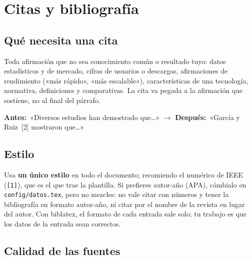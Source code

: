 \documentclass[11pt,a4paper]{article}
\newcommand{\antes}[1]{\textcolor{BrickRed!80!black}{\textbf{Antes:}}~«#1»}
\newcommand{\despues}[1]{\textcolor{ForestGreen!80!black}{\textbf{Después:}}~«#1»}
\begin{document}
\section{Citas y bibliografía}
\label{sec:citas}

\subsection{Qué necesita una cita}

Toda afirmación que no sea conocimiento común o resultado tuyo: datos
estadísticos y de mercado, cifras de usuarios o descargas, afirmaciones de
rendimiento («más rápido», «más escalable»), características de una tecnología,
normativa, definiciones y comparativas. La cita va pegada a la afirmación que
sostiene, no al final del párrafo.

\begin{center}
  \antes{Diversos estudios han demostrado que\ldots} $\rightarrow$
  \despues{García y Ruiz~[2] mostraron que\ldots}
\end{center}

\subsection{Estilo}

Usa \textbf{un único estilo} en todo el documento; recomiendo el numérico de
IEEE (\texttt{[1]}), que es el que trae la plantilla. Si prefieres autor-año
(APA), cámbialo en \texttt{config/datos.tex}, pero no mezcles: no vale citar
con números y tener la bibliografía en formato autor-año, ni citar por el nombre
de la revista en lugar del autor. Con biblatex, el formato de cada entrada sale
solo; tu trabajo es que los datos de la entrada sean correctos.

\subsection{Calidad de las fuentes}
\end{document}
